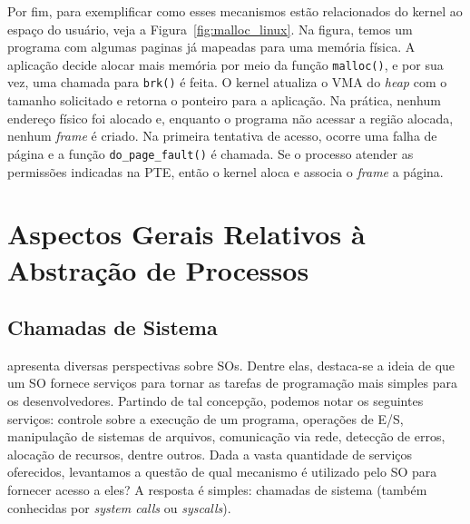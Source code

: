 Por fim, para exemplificar como esses mecanismos estão relacionados do kernel ao
espaço do usuário, veja a Figura~\ref{fig:malloc_linux}. Na figura, temos um programa com
algumas paginas já mapeadas para uma memória física. A aplicação decide alocar
mais memória por meio da função \texttt{malloc()}, e por sua vez, uma chamada
para \texttt{brk()} é feita. O kernel atualiza o VMA do \textit{heap} com o
tamanho solicitado e retorna o ponteiro para a aplicação. Na prática, nenhum
endereço físico foi alocado e, enquanto o programa não acessar a região alocada,
nenhum \emph{frame} é criado. Na primeira tentativa de acesso, ocorre uma falha
de página e a função \texttt{do\_page\_fault()} é chamada. Se o processo
atender as permissões indicadas na PTE, então o kernel aloca e associa o
\emph{frame} a página.

\section{Aspectos Gerais Relativos à Abstração de Processos}

\subsection{Chamadas de Sistema}

\citet{silberschatz} apresenta diversas perspectivas sobre SOs. Dentre elas,
destaca-se a ideia de que um SO fornece serviços para tornar as tarefas de
programação mais simples para os desenvolvedores. Partindo de tal concepção,
podemos notar os seguintes serviços: controle sobre a execução de um programa,
operações de E/S, manipulação de sistemas de arquivos, comunicação via rede,
detecção de erros, alocação de recursos, dentre outros. Dada a vasta quantidade
de serviços oferecidos, levantamos a questão de qual mecanismo é utilizado pelo
SO para fornecer acesso a eles? A resposta é simples: chamadas de
sistema (também conhecidas por \emph{system calls} ou \emph{syscalls}).

